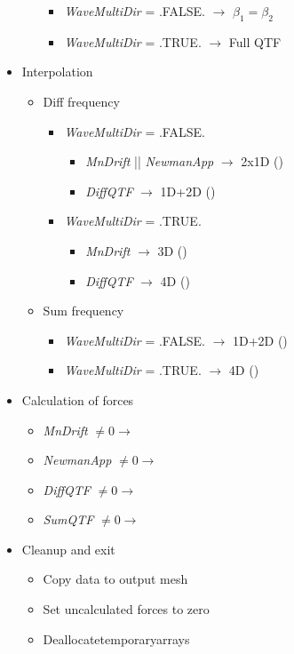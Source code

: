 \begin{itemize}
\begin{itemize}
      \begin{itemize}
         \item{\emph{WaveMultiDir} = .FALSE. $\rightarrow$ $\beta_1 = \beta_2$}
         \item{\emph{WaveMultiDir} = .TRUE. $\rightarrow$ Full QTF}
      \end{itemize}
   \end{itemize}
   \item{Interpolation}
   \begin{itemize}
      \item{Diff frequency}
      \begin{itemize}
         \item{\emph{WaveMultiDir} = .FALSE.}
         \begin{itemize}
            \item{\emph{MnDrift} || \emph{NewmanApp} $\rightarrow$ 2x1D ()}
            \item{\emph{DiffQTF} $\rightarrow$   1D+2D ()}
         \end{itemize}
         \item{\emph{WaveMultiDir} = .TRUE.}
         \begin{itemize}
            \item{\emph{MnDrift} $\rightarrow$   3D ()}
            \item{\emph{DiffQTF} $\rightarrow$   4D ()}
         \end{itemize}
      \end{itemize}
      \item{Sum frequency}
      \begin{itemize}
         \item{\emph{WaveMultiDir} = .FALSE. $\rightarrow$  1D+2D ()}
         \item{\emph{WaveMultiDir} = .TRUE. $\rightarrow$   4D ()}
      \end{itemize}
   \end{itemize}
   \item{Calculation of forces}
   \begin{itemize}
      \item{\emph{MnDrift} $\ne 0 \rightarrow$     }
      \item{\emph{NewmanApp} $\ne 0 \rightarrow$   }
      \item{\emph{DiffQTF} $\ne 0 \rightarrow$     }
      \item{\emph{SumQTF} $\ne 0 \rightarrow$      }
   \end{itemize}
   \item{Cleanup and exit}
   \begin{itemize}
      \item{Copy data to output mesh}
      \item{Set uncalculated forces to zero}
      \item{Deallocatetemporaryarrays}
   \end{itemize}
\end{itemize}

